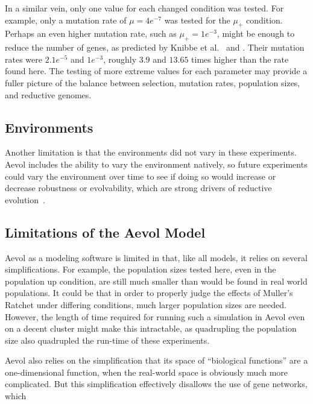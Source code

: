 In a similar vein, only one value for each changed condition was tested. For example, only a mutation rate of $\mu = 4e^{-7}$ was tested for the $\mu_+$ condition. Perhaps an even higher mutation rate, such as $\mu_+ = 1e^{-3}$, might be enough to reduce the number of genes, as predicted by Knibbe et al.~\cite{Knibbe2007} and \cite{Liard.2018}. Their mutation rates were $2.1e^{-5}$ and $1e^{-3}$, roughly $3.9$ and $13.65$ times higher than the rate found here. The testing of more extreme values for each parameter may provide a fuller picture of the balance between selection, mutation rates, population sizes, and reductive genomes. 

\subsection{Environments}
Another limitation is that the environments did not vary in these experiments. Aevol includes the ability to vary the environment natively, so future experiments could vary the environment over time to see if doing so would increase or decrease robustness or evolvability, which are strong drivers of reductive evolution~\cite{Batut.2013}. 

\subsection{Limitations of the Aevol Model}
Aevol as a modeling software is limited in that, like all models, it relies on several simplifications. For example, the population sizes tested here, even in the population up condition, are still much smaller than would be found in real world populations. It could be that in order to properly judge the effects of Muller's Ratchet under differing conditions, much larger population sizes are needed. However, the length of time required for running such a simulation in Aevol even on a decent cluster might make this intractable, as quadrupling the population size also quadrupled the run-time of these experiments. 

Aevol also relies on the simplification that its space of ``biological functions'' are a one-dimensional function, when the real-world space is obviously much more complicated. But this simplification effectively disallows the use of gene networks, which %

